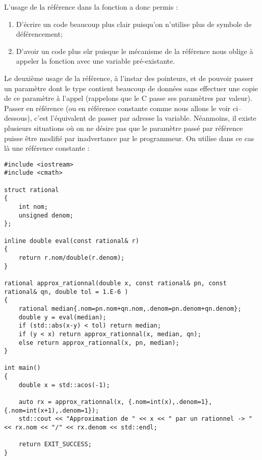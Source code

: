 L'usage de la référence dans la fonction a donc permis :
\begin{enumerate}
    \item D'écrire un code beaucoup plus clair puisqu'on n'utilise plus de symbole de déférencement;
    \item D'avoir un code plus sûr puisque le mécanisme de la référence nous oblige à appeler la fonction avec une variable
    pré-existante.
\end{enumerate}

Le deuxième usage de la référence, à l'instar des pointeurs, et de pouvoir passer un paramètre dont le type contient beaucoup
de données sans effectuer une copie de ce paramètre à l'appel (rappelons que le C passe ses paramètres par valeur). 
Passer en référence (ou en référence constante comme nous allons le voir ci--dessous), c'est l'équivalent de passer par adresse la variable. Néanmoins, il existe plusieurs situations où on ne désire pas que le paramètre passé par référence puisse être modifié par inadvertance par le programmeur. On utilise dans ce cas là une référence constante :

\begin{lstlisting}[caption=Exemple d'utilisation de la référence constante]
#include <iostream>
#include <cmath>

struct rational
{
    int nom;
    unsigned denom;
};

inline double eval(const rational& r)
{
    return r.nom/double(r.denom);
}

rational approx_rationnal(double x, const rational& pn, const rational& qn, double tol = 1.E-6 )
{
    rational median{.nom=pn.nom+qn.nom,.denom=pn.denom+qn.denom};
    double y = eval(median);
    if (std::abs(x-y) < tol) return median;
    if (y < x) return approx_rationnal(x, median, qn);
    else return approx_rationnal(x, pn, median);
}

int main()
{
    double x = std::acos(-1);

    auto rx = approx_rationnal(x, {.nom=int(x),.denom=1}, {.nom=int(x+1),.denom=1});
    std::cout << "Approximation de " << x << " par un rationnel -> " << rx.nom << "/" << rx.denom << std::endl;

    return EXIT_SUCCESS;
}
\end{lstlisting}

